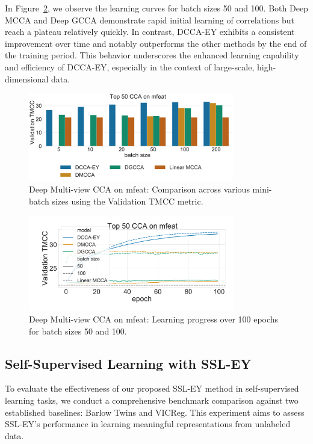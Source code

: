 In Figure~\ref{fig:dmcca_lr}, we observe the learning curves for batch sizes 50 and 100. Both Deep MCCA and Deep GCCA demonstrate rapid initial learning of correlations but reach a plateau relatively quickly. In contrast, DCCA-EY exhibits a consistent improvement over time and notably outperforms the other methods by the end of the training period. This behavior underscores the enhanced learning capability and efficiency of DCCA-EY, especially in the context of large-scale, high-dimensional data.

\begin{figure}
    \centering
    \includegraphics[width=0.8\textwidth]{figures/DMCCA/mfeat_models_different_batch_sizes}
    \caption{Deep Multi-view CCA on mfeat: Comparison across various mini-batch sizes using the Validation TMCC metric.}\label{fig:dmcca_corr}
\end{figure}

\begin{figure}
    \centering
    \includegraphics[width=0.8\textwidth]{figures/DMCCA/mfeat_allbatchsizes_pcc}
    \caption{Deep Multi-view CCA on mfeat: Learning progress over 100 epochs for batch sizes 50 and 100.}\label{fig:dmcca_lr}
\end{figure}

\subsection{Self-Supervised Learning with SSL-EY}

To evaluate the effectiveness of our proposed SSL-EY method in self-supervised learning tasks, we conduct a comprehensive benchmark comparison against two established baselines: Barlow Twins and VICReg. This experiment aims to assess SSL-EY's performance in learning meaningful representations from unlabeled data.

